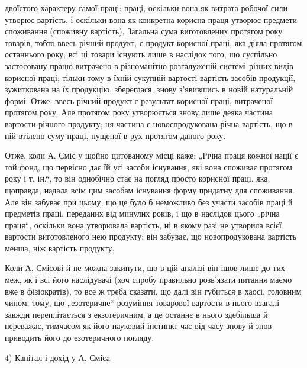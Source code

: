 \parcont{}  %
двоїстого характеру самої праці: праці, оскільки вона як витрата робочої сили утворює вартість, і
оскільки вона як конкретна корисна праця утворює предмети споживання (споживну вартість). Загальна
сума виготовлених протягом року товарів, тобто ввесь річний продукт, є продукт корисної праці, яка
діяла протягом останнього року; всі ці
товари існують лише в наслідок того, що суспільно застосовану працю витрачено в різноманітно
розгалуженій системі різних видів корисної праці; тільки тому в їхній сукупній вартості вартість
засобів продукції, зужиткована на їх продукцію, збереглася, знову з’явившись в новій натуральній
формі. Отже, ввесь річний продукт є результат корисної праці, витраченої протягом року. Але протягом
року утворюється знову лише деяка частина вартости річного продукту; ця частина є новоспродукована
річна вартість, що в ній втілено суму праці, пущеної в рух протягом даного року.

Отже, коли А. Сміс у щойно цитованому місці каже: „Річна праця кожної нації є той фонд, що первісно
дає їй усі засоби існування, які вона споживає протягом року і т. ін.“, то він однобічно стає на
погляд просто корисної праці, яка, щоправда, надала всім цим засобам існування форму придатну для
споживання. Але він забуває при цьому, що це
було б неможливо без участи засобів праці й предметів праці, переданих від минулих років, і що в
наслідок цього „річна праця“, оскільки вона утворювала вартість, ні в якому разі не утворила всієї
вартости виготовленого нею продукту; він забуває, що новопродукована вартість менша, ніж вартість
продукту.

Коли А. Смісові й не можна закинути, що в цій аналізі він ішов лише до тих меж, як і всі його
наслідувачі (хоч спробу правильно розв’язати питання маємо вже в фізіократів), то все ж треба
сказати, що далі він губиться в хаосі, головним чином, тому, що „езотеричне“ розуміння товарової
вартости в нього взагалі завжди переплітається з екзотеричним, а це останнє в нього здебільша й
переважає, тимчасом як його науковий інстинкт час від часу знову й знов приводить його до
езотеричного погляду.

4) Капітал і дохід у А. Сміса

